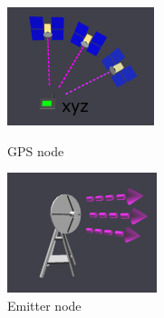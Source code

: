 \begin{figure}[!htb]
        \includegraphics[width=\linewidth]{assets/images/communication/devices/gps.png}
        \caption{GPS node}\label{fig:GPS}
    \endminipage\hfill
        \includegraphics[width=\linewidth]{assets/images/communication/devices/emitter.png}
        \caption{Emitter node}\label{fig:Emitter}
    \endminipage\hfill

\end{figure}
